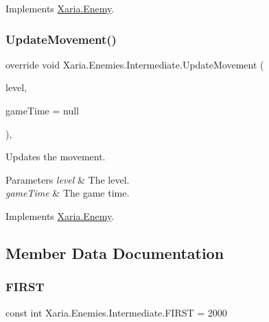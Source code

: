 Implements \hyperlink{classXaria_1_1Enemy_a229b595e96e1429a9e9b1d9816d4370b}{Xaria.\+Enemy}.

\mbox{\label{classXaria_1_1Enemies_1_1Intermediate_a2b9bcfbfd205f279db56bb86c776c07a}} 
\subsubsection{\texorpdfstring{Update\+Movement()}{UpdateMovement()}}
{\footnotesize\ttfamily override void Xaria.\+Enemies.\+Intermediate.\+Update\+Movement (\begin{DoxyParamCaption}\item[{\hyperlink{classXaria_1_1Level}{Level}}]{level,  }\item[{Game\+Time}]{game\+Time = {\ttfamily null} }\end{DoxyParamCaption})\hspace{0.3cm}{\ttfamily [inline]}, {\ttfamily [virtual]}}



Updates the movement. 


\begin{DoxyParams}{Parameters}
{\em level} & The level.\\
\hline
{\em game\+Time} & The game time.\\
\hline
\end{DoxyParams}


Implements \hyperlink{classXaria_1_1Enemy_abe1058263c5512b5e098e73d3b6d704c}{Xaria.\+Enemy}.



\subsection{Member Data Documentation}
\mbox{\label{classXaria_1_1Enemies_1_1Intermediate_a820de1bc87b6f24a2c6e9e6184bdeb2d}} 
\subsubsection{\texorpdfstring{F\+I\+R\+ST}{FIRST}}
{\footnotesize\ttfamily const int Xaria.\+Enemies.\+Intermediate.\+F\+I\+R\+ST = 2000\hspace{0.3cm}{\ttfamily [private]}}



